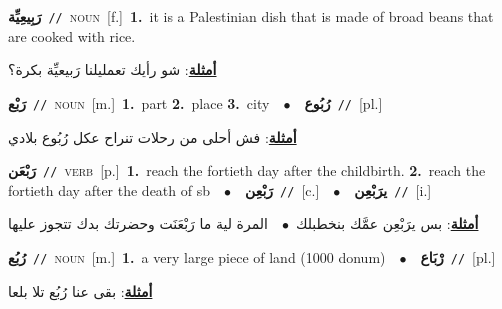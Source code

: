 \documentclass[10pt,a4paper,twoside]{article} %
\begin{document}
\begin{multicols}{2}
{\setlength\topsep{0pt}\textbf{\foreignlanguage{arabic}{رَبِيعِيِّة}}\ {\color{gray}\texttt{//}\color{black}}\ \textsc{noun}\ [f.]\ \textbf{1.}~it is a Palestinian dish that is made of broad beans that are cooked with rice.\  \begin{flushright}\color{gray}\foreignlanguage{arabic}{\textbf{\underline{\foreignlanguage{arabic}{أمثلة}}}: شو رأيك تعمليلنا رَبيعيِّة بكرة؟}\end{flushright}\color{black}} \vspace{2mm}

{\setlength\topsep{0pt}\textbf{\foreignlanguage{arabic}{رَبْع}}\ {\color{gray}\texttt{//}\color{black}}\ \textsc{noun}\ [m.]\ \textbf{1.}~part  \textbf{2.}~place  \textbf{3.}~city\ \ $\bullet$\ \ \setlength\topsep{0pt}\textbf{\foreignlanguage{arabic}{رُبُوع}}\ {\color{gray}\texttt{//}\color{black}}\ [pl.]\  \begin{flushright}\color{gray}\foreignlanguage{arabic}{\textbf{\underline{\foreignlanguage{arabic}{أمثلة}}}: فش أحلى من رحلات تنراح عكل رُبُوع بلادي}\end{flushright}\color{black}} \vspace{2mm}

{\setlength\topsep{0pt}\textbf{\foreignlanguage{arabic}{رَبْعَن}}\ {\color{gray}\texttt{//}\color{black}}\ \textsc{verb}\ [p.]\ \textbf{1.}~reach the fortieth day after the childbirth.  \textbf{2.}~reach the fortieth day after the death of sb\ \ $\bullet$\ \ \setlength\topsep{0pt}\textbf{\foreignlanguage{arabic}{رَبْعِن}}\ {\color{gray}\texttt{//}\color{black}}\ [c.]\ \ $\bullet$\ \ \setlength\topsep{0pt}\textbf{\foreignlanguage{arabic}{يرَبْعِن}}\ {\color{gray}\texttt{//}\color{black}}\ [i.]\  \begin{flushright}\color{gray}\foreignlanguage{arabic}{\textbf{\underline{\foreignlanguage{arabic}{أمثلة}}}: بس يرَبْعِن عمَّك بنخطبلك\ $\bullet$\ \  المرة لية ما رَبْعَنَت وحضرتك بدك تتجوز عليها}\end{flushright}\color{black}} \vspace{2mm}

{\setlength\topsep{0pt}\textbf{\foreignlanguage{arabic}{رُبُع}}\ {\color{gray}\texttt{//}\color{black}}\ \textsc{noun}\ [m.]\ \textbf{1.}~a very large piece of land (1000 donum)\ \ $\bullet$\ \ \setlength\topsep{0pt}\textbf{\foreignlanguage{arabic}{رْبَاع}}\ {\color{gray}\texttt{//}\color{black}}\ [pl.]\  \begin{flushright}\color{gray}\foreignlanguage{arabic}{\textbf{\underline{\foreignlanguage{arabic}{أمثلة}}}: بقى عنا رُبُع تلا بلعا}\end{flushright}\color{black}} \vspace{2mm}


\end{multicols}
\end{document}

